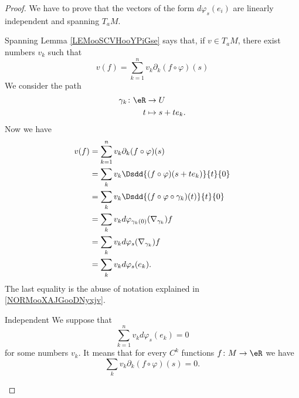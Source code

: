\begin{proof}
    We have to prove that the vectors of the form \( d\varphi_s(e_i)\) are linearly independent and spanning \( T_aM\).
    \begin{subproof}
        \item[Spanning]
            Lemma \ref{LEMooSCVHooYPiGse} says that, if \( v\in T_aM\), there exist numbers \( v_k\) such that
            \begin{equation}
                v(f)=\sum_{k=1}^nv_k\partial_k(f\circ\varphi)(s)
            \end{equation}
            We consider the path
            \begin{equation}
                \begin{aligned}
                    \gamma_k\colon \eR&\to U \\
                    t&\mapsto s+te_k. 
                \end{aligned}
            \end{equation}
            Now we have
            \begin{subequations}
                \begin{align}
                    v(f)&=\sum_{k=1}^nv_k\partial_k(f\circ\varphi)(s)\\
                    &=\sum_kv_k\Dsdd{ (f\circ\varphi)(s+te_k) }{t}{0}\\
                    &=\sum_kv_k\Dsdd{ (f\circ\varphi\circ\gamma_k)(t) }{t}{0}\\
                    &=\sum_kv_kd\varphi_{\gamma_k(0)}(\nabla_{\gamma_k})f\\
                    &=\sum_kv_kd\varphi_s(\nabla_{\gamma_k})f\\
                    &=\sum_kv_kd\varphi_s(e_k).
                \end{align}
            \end{subequations}
            The last equality is the abuse of notation explained in \ref{NORMooXAJGooDNyxjv}.
        \item[Independent]
            We suppose that
            \begin{equation}
                \sum_{k=1}^nv_kd\varphi_s(e_k)=0
            \end{equation}
            for some numbers \( v_k\). It means that for every \( C^k\) functions \( f\colon M\to \eR\) we have
            \begin{equation}
                \sum_{k}v_k\partial_k(f\circ \varphi)(s)=0.
            \end{equation}

\end{subproof}
\end{proof}
